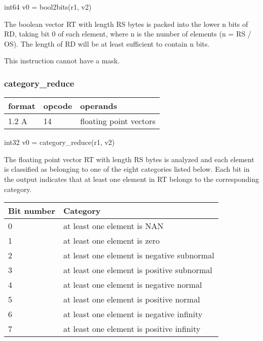 \documentclass[forwardcom.tex]{subfiles}
\begin{document}
int64 v0 = bool2bits(r1, v2)
\vspace{2mm}

The boolean vector RT with length RS bytes is packed into the lower n bits of RD, taking bit 0 of each element, where n is the number of elements (n = RS / OS). 
The length of RD will be at least sufficient to contain n bits.
\vspace{2mm}

This instruction cannot have a mask.
\vspace{2mm}

\subsubsection{category\_reduce}
\label{table:categoryReduceInstruction}
\begin{tabular}{|p{12mm}|p{12mm}|p{110mm}|}
\hline
\bfseries format & \bfseries opcode & \bfseries operands \\ \hline
1.2 A & 14 & floating point vectors \\ \hline
\end{tabular}
\vspace{2mm}

int32 v0 = category\_reduce(r1, v2)
\vspace{2mm}

The floating point vector RT with length RS bytes is analyzed and each element is classified as belonging to one of the eight categories listed below. Each bit in the output indicates that at least one element in RT belongs to the corresponding category.
\vspace{2mm}

\begin{tabular}{|p{24mm}|p{115mm}|}
\hline
\bfseries Bit number & \bfseries Category \\ \hline
0 & at least one element is NAN \\
1 & at least one element is zero \\
2 & at least one element is negative subnormal \\
3 & at least one element is positive subnormal \\
4 & at least one element is negative normal \\
5 & at least one element is positive normal \\
6 & at least one element is negative infinity \\
7 & at least one element is positive infinity \\
\hline
\end{tabular}
\vspace{2mm}
\end{document}
